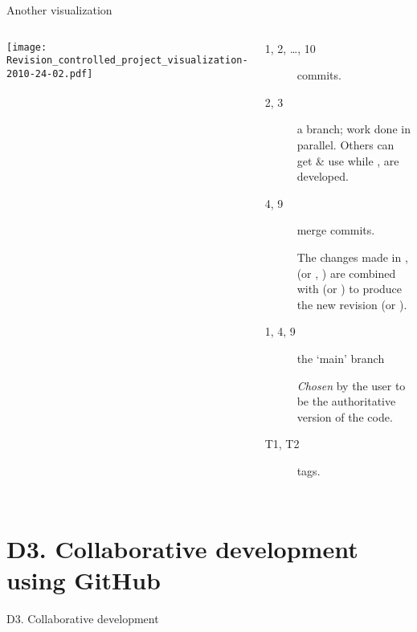 \documentclass[12pt,aspectratio=169]{beamer}
\begin{document}
\begin{frame}{Another visualization}
  \begin{columns}[T]
    \texttt{[image: Revision\_controlled\_project\_visualization-2010-24-02.pdf]}

    \begin{description}
      \item [1, 2, …, 10] commits.
      \item [2, 3] a branch; work done in parallel.
            Others can get \& use  while ,  are developed.
      \item [4, 9] merge commits.

            The changes made in ,  (or , ) are combined with  (or ) to produce the new revision  (or ).
      \item [1, 4, 9] the ‘main’ branch

            \emph{Chosen} by the user to be the authoritative version of the code.
      \item [T1, T2] tags.
    \end{description}

  \end{columns}
\end{frame}

\section{D3. Collaborative development using GitHub}
\begin{frame}{D3. Collaborative development}
  \tableofcontents[hideothersubsections]
\end{frame}
\end{document}
